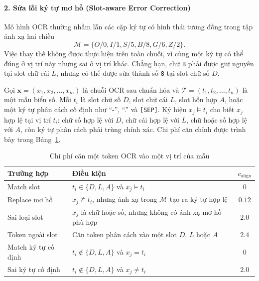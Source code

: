 \documentclass[../DoAn.tex]{subfiles}
\begin{document}
\paragraph{2. Sửa lỗi ký tự mơ hồ (Slot-aware Error Correction)}
Mô hình OCR thường nhầm lẫn các cặp ký tự có hình thái tương đồng trong tập
ánh xạ hai chiều
\[
\mathcal{M}=\{O/0,I/1,S/5,B/8,G/6,Z/2\}.
\]
Việc thay thế không được thực hiện trên toàn chuỗi, vì cùng một ký tự có thể
đúng ở vị trí này nhưng sai ở vị trí khác. Chẳng hạn, chữ \texttt{B} phải
được giữ nguyên tại slot chữ cái $L$, nhưng có thể được sửa thành số
\texttt{8} tại slot chữ số $D$.

Gọi $\mathbf{x}=(x_1,x_2,\ldots,x_m)$ là chuỗi OCR sau chuẩn hóa và
$\mathcal{T}=(t_1,t_2,\ldots,t_n)$ là một mẫu biển số. Mỗi $t_i$ là slot
chữ số $D$, slot chữ cái $L$, slot hỗn hợp $A$, hoặc một ký tự phân cách cố
định như ``-'', ``.'' và \texttt{[SEP]}. Ký hiệu $x_j\models t_i$ cho biết
$x_j$ hợp lệ tại vị trí $t_i$: chữ số hợp lệ với $D$, chữ cái hợp lệ với
$L$, chữ hoặc số hợp lệ với $A$, còn ký tự phân cách phải trùng chính xác.
Chi phí căn chỉnh được trình bày trong Bảng~\ref{tab:ambiguity-align-cost}.

\begin{table}[htbp]
\centering
\caption{Chi phí căn một token OCR vào một vị trí của mẫu}
\label{tab:ambiguity-align-cost}
\begin{tabularx}{\textwidth}{|l|X|c|}
\hline
Trường hợp & Điều kiện & $c_{\mathrm{align}}$ \\
\hline
Match slot & $t_i\in\{D,L,A\}$ và $x_j\models t_i$ & $0$ \\
\hline
Replace mơ hồ & $x_j\not\models t_i$, nhưng ánh xạ trong $\mathcal{M}$ tạo ra ký tự hợp lệ & $0.12$ \\
\hline
Sai loại slot & $x_j$ là chữ hoặc số, nhưng không có ánh xạ mơ hồ phù hợp & $2.0$ \\
\hline
Token ngoài slot & Căn token phân cách vào một slot $D$, $L$ hoặc $A$ & $2.4$ \\
\hline
Match ký tự cố định & $t_i\notin\{D,L,A\}$ và $x_j=t_i$ & $0$ \\
\hline
Sai ký tự cố định & $t_i\notin\{D,L,A\}$ và $x_j\ne t_i$ & $2.0$ \\
\hline
\end{tabularx}
\end{table}
\end{document}
